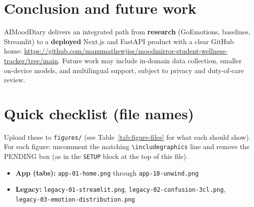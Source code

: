 \documentclass[11pt,a4paper]{article}
\begin{document}
\section{Conclusion and future work}
AIMoodDiary delivers an integrated path from \textbf{research} (GoEmotions, baselines, Streamlit) to a \textbf{deployed} Next.js and FastAPI product with a clear GitHub home: \url{https://github.com/manumathewjiss/moodmirror-student-wellness-tracker/tree/main}. Future work may include in-domain data collection, smaller on-device models, and multilingual support, subject to privacy and duty-of-care review.

\appendix
\section{Quick checklist (file names)}

\noindent
Upload these to \texttt{figures/} (see Table~\ref{tab:figure-files} for what each should show). For each figure: uncomment the matching \texttt{\textbackslash includegraphics} line and remove the PENDING box (as in the \texttt{SETUP} block at the top of this file).
\begin{itemize}[itemsep=0.2em, leftmargin=1.1em, label={—}]
  \item \textbf{App (tabs):} \texttt{app-01-home.png} through \texttt{app-10-unwind.png}
  \item \textbf{Legacy:} \texttt{legacy-01-streamlit.png}, \texttt{legacy-02-confusion-3cl.png}, \texttt{legacy-03-emotion-distribution.png}
\end{itemize}
\end{document}
